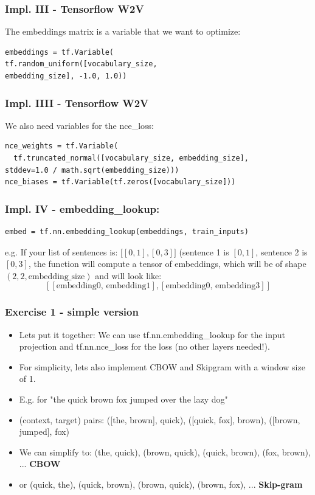 \documentclass{beamer}
\begin{document}
 \begin{frame}[fragile]
  \frametitle{Impl. III - Tensorflow W2V}
  The embeddings matrix is a variable that we want to optimize:
  \begin{lstlisting}
embeddings = tf.Variable(
tf.random_uniform([vocabulary_size,
embedding_size], -1.0, 1.0))
\end{lstlisting}    
\end{frame}

 \begin{frame}[fragile]
 \frametitle{Impl. IIII - Tensorflow W2V}
We also need variables for the nce\_loss:

\begin{footnotesize}
\begin{lstlisting}
nce_weights = tf.Variable(
  tf.truncated_normal([vocabulary_size, embedding_size],
stddev=1.0 / math.sqrt(embedding_size)))
nce_biases = tf.Variable(tf.zeros([vocabulary_size]))
\end{lstlisting}   
\end{footnotesize}    
\end{frame}

 \begin{frame}[fragile]
  \frametitle{Impl. IV - embedding\_lookup:}
  
  \begin{footnotesize}
 \begin{lstlisting}
embed = tf.nn.embedding_lookup(embeddings, train_inputs)
\end{lstlisting}
\end{footnotesize}    

e.g. If your list of sentences is: $\big[[0, 1], [0, 3]\big]$ (sentence 1 is $[0, 1]$, sentence 2 is $[0, 3]$, the function will compute a tensor of embeddings, which will be of shape $(2, 2, \text{embedding\_size})$ and will look like:
\\
$$[[\text{embedding0, embedding1}], [\text{embedding0, embedding3}]]$$

\end{frame}

 \begin{frame}[fragile]

  \frametitle{Exercise 1 - simple version}
   \begin{itemize}
   		\item Lets put it together: We can use tf.nn.embedding\_lookup for the input projection and tf.nn.nce\_loss for the loss (no other layers needed!).
		\item For simplicity, lets also implement CBOW and Skipgram with a window size of 1. 
		\item E.g. for "the quick brown fox jumped over the lazy dog"
		\item (context, target) pairs: ([the, brown], quick), ([quick, fox], brown), ([brown, jumped], fox)
		\item We can simplify to: (the, quick), (brown, quick), (quick, brown), (fox, brown), ... \textbf{CBOW}
		\item or (quick, the), (quick, brown), (brown, quick), (brown, fox), ... \textbf{Skip-gram}
	\end{itemize}
\end{frame}
\end{document}
